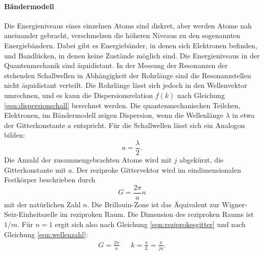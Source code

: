 \paragraph{Bändermodell}
Die Energieniveaus eines einzelnen Atoms sind diskret, aber werden Atome nah aneinander gebracht, verschmelzen die höheren Niveaus zu den sogenannten Energiebändern.
Dabei gibt es Energiebänder, in denen sich Elektronen befinden, und Bandlücken, in denen keine Zustände möglich sind.
Die Energieniveaus in der Quantenmechanik sind äquidistant.
In der Messung der Resonanzen der stehenden Schallwellen in Abhängigkeit der Rohrlänge sind die Resonanzstellen nicht äquidistant verteilt.
Die Rohrlänge lässt sich jedoch in den Wellenvektor umrechnen, und es kann die Dispersionsrelation $f(k)$ nach Gleichung \eqref{eqn:dispersionschall} berechnet werden.
Die quantenmechanischen Teilchen, Elektronen, im Bändermodell zeigen Dispersion, wenn die Wellenlänge $\lambda$ in etwa der Gitterkonstante $a$ entspricht.
Für die Schallwellen lässt sich ein Analogon bilden:
\begin{equation}
  a = \frac{\lambda}{2}.
\end{equation}
Die Anzahl der zusammengebrachten Atome wird mit $j$ abgekürzt, die Gitterkonstante mit $a$.
Der reziproke Gittervektor wird im eindimensionalen Festkörper beschrieben durch
\begin{equation}
  G= \frac{2 \pi }{a} n
  \label{eqn:reziprokesgitter}
\end{equation}
mit der natürlichen Zahl $n$.
Die Brillouin-Zone ist das Äquivalent zur Wigner-Seiz-Einheitszelle im reziproken Raum.
Die Dimension des reziproken Raums ist $\si{1/m}$.
Für $n=1$ ergit sich also nach Gleichung \eqref{eqn:reziprokesgitter} und nach Gleichung \eqref{eqn:wellenzahl}:
\begin{align}
  G= \frac{2 \pi }{a}  && k = \frac{ \pi }{L} = \frac{\pi}{ j a}.
  \label{eqn:unsergitter}
\end{align}
